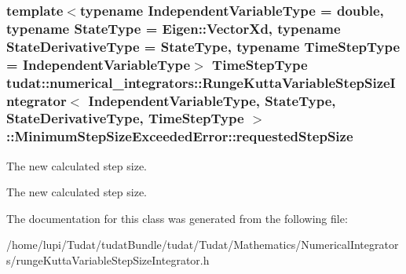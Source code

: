\subsubsection[{\texorpdfstring{requested\+Step\+Size}{requestedStepSize}}]{\setlength{\rightskip}{0pt plus 5cm}template$<$typename Independent\+Variable\+Type  = double, typename State\+Type  = Eigen\+::\+Vector\+Xd, typename State\+Derivative\+Type  = State\+Type, typename Time\+Step\+Type  = Independent\+Variable\+Type$>$ Time\+Step\+Type {\bf tudat\+::numerical\+\_\+integrators\+::\+Runge\+Kutta\+Variable\+Step\+Size\+Integrator}$<$ Independent\+Variable\+Type, State\+Type, State\+Derivative\+Type, Time\+Step\+Type $>$\+::Minimum\+Step\+Size\+Exceeded\+Error\+::requested\+Step\+Size}\hypertarget{classtudat_1_1numerical__integrators_1_1RungeKuttaVariableStepSizeIntegrator_1_1MinimumStepSizeExceededError_a1891f06b118052203b3ceaf2b10de36a}{}\label{classtudat_1_1numerical__integrators_1_1RungeKuttaVariableStepSizeIntegrator_1_1MinimumStepSizeExceededError_a1891f06b118052203b3ceaf2b10de36a}


The new calculated step size. 

The new calculated step size. 

The documentation for this class was generated from the following file\+:\begin{DoxyCompactItemize}
\item 
/home/lupi/\+Tudat/tudat\+Bundle/tudat/\+Tudat/\+Mathematics/\+Numerical\+Integrators/runge\+Kutta\+Variable\+Step\+Size\+Integrator.\+h\end{DoxyCompactItemize}
